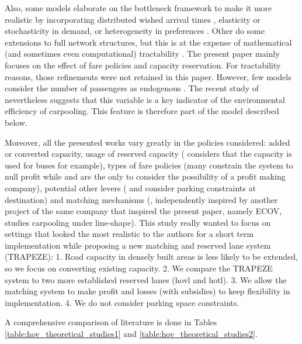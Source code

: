 \documentclass[english, a4paper]{article}
\theoremstyle{plain}
\theoremstyle{definition}
\theoremstyle{remark}
\begin{document}
Also, some models elaborate on the bottleneck framework to make it more realistic by incorporating distributed wished arrival times \parencite{gonzales_morning_2012}, elasticity \parencite{yang_carpooling_1999, huang_models_2000, leurent_what_2024} or stochasticity \parencite{boyles_incorporating_2015} in demand, or heterogeneity in preferences \parencites{boyles_incorporating_2015, yu_carpooling_2019, de_palma_influence_2022}. Other do some extensions to full network structures, but this is at the expense of mathematical (and sometimes even computational) tractability \parencites{xu_complementarity_2015, di_link-node_2018}. The present paper mainly focuses on the effect of fare policies and capacity reservation. For tractability reasons, those refinements were not retained in this paper. However, few models consider the number of passengers as endogenous \parencites{yu_carpooling_2019, leurent_what_2024}. The recent study of \cite{olave-cruz_does_2025} nevertheless suggests that this variable is a key indicator of the environmental efficiency of carpooling. This feature is therefore part of the model described below.

Moreover, all the presented works vary greatly in the policies considered: added or converted capacity, usage of reserved capacity (\cite{gonzales_morning_2012} considers that the capacity is used for buses for example), types of fare policies (many constrain the system to null profit while \cite{wang_dynamic_2019} and \cite{leurent_what_2024} are the only to consider the possibility of a profit making company), potential other levers (\cite{xiao_morning_2016} and \cite{xiao_tradable_2021} consider parking constraints at destination) and matching mechanisms (\cite{leurent_what_2024}, independently inspired by another project of the same company that inspired the present paper, namely ECOV, studies carpooling under line-shape). This study really wanted to focus on settings that looked the most realistic to the authors for a short term implementation while proposing a new matching and reserved lane system (TRAPEZE): 1. Road capacity in densely built areas is less likely to be extended, so we focus on converting existing capacity. 2. We compare the TRAPEZE system to two more established reserved lanes (\acrshort{hovl} and \acrshort{hotl}). 3. We allow the matching system to make profit and losses (with subsidies) to keep flexibility in implementation. 4. We do not consider parking space constraints.

A comprehensive comparison of literature is done in  Tables \ref{table:hov_theoretical_studies1} and \ref{table:hov_theoretical_studies2}.
\end{document}
